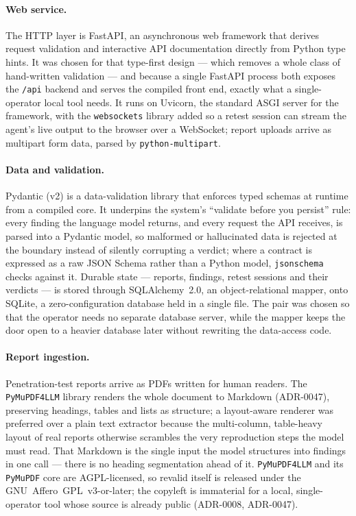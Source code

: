 \paragraph{Web service.} The HTTP layer is FastAPI, an asynchronous web framework
that derives request validation and interactive API documentation directly from
Python type hints. It was chosen for that type-first design --- which removes a whole
class of hand-written validation --- and because a single FastAPI process both
exposes the \texttt{/api} backend and serves the compiled front end, exactly what a
single-operator local tool needs. It runs on Uvicorn, the standard ASGI server for
the framework, with the \texttt{websockets} library added so a retest session can
stream the agent's live output to the browser over a WebSocket; report uploads arrive
as multipart form data, parsed by \texttt{python-multipart}.

\paragraph{Data and validation.} Pydantic (v2) is a data-validation library that
enforces typed schemas at runtime from a compiled core. It underpins the system's
``validate before you persist'' rule: every finding the language model returns, and
every request the API receives, is parsed into a Pydantic model, so malformed or
hallucinated data is rejected at the boundary instead of silently corrupting a
verdict; where a contract is expressed as a raw JSON Schema rather than a Python
model, \texttt{jsonschema} checks against it. Durable state --- reports, findings,
retest sessions and their verdicts --- is stored through SQLAlchemy~2.0, an
object-relational mapper, onto SQLite, a zero-configuration database held in a single
file. The pair was chosen so that the operator needs no separate database server,
while the mapper keeps the door open to a heavier database later without rewriting
the data-access code.

\paragraph{Report ingestion.} Penetration-test reports arrive as PDFs written for
human readers. The \texttt{PyMuPDF4LLM} library renders the whole document to
Markdown (ADR-0047), preserving headings, tables and lists as structure; a
layout-aware renderer was preferred over a plain text extractor because the
multi-column, table-heavy layout of real reports otherwise scrambles the very
reproduction steps the model must read. That Markdown is the single input the model
structures into findings in one call --- there is no heading segmentation ahead of
it. \texttt{PyMuPDF4LLM} and its \texttt{PyMuPDF} core are AGPL-licensed, so revalid
itself is released under the GNU~Affero~GPL~v3-or-later; the copyleft is immaterial for
a local, single-operator tool whose source is already public (ADR-0008, ADR-0047).

